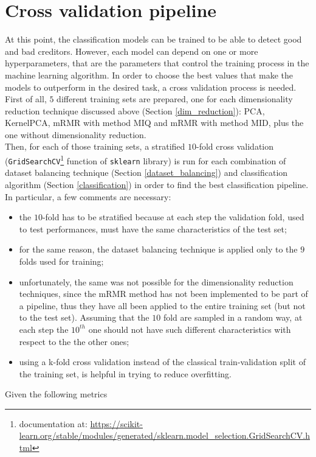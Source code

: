 \documentclass[letterpaper]{article}
\begin{document}
	\section{Cross validation pipeline} \label{cv}
	At this point, the classification models can be trained to be able to detect good and bad creditors. However, each model can depend on one or more hyperparameters, that are the parameters that control the training process in the machine learning algorithm. In order to choose the best values that make the models to outperform in the desired task, a cross validation process is needed. \\
	First of all, $5$ different training sets are prepared, one for each dimensionality reduction technique discussed above (Section \ref{dim_reduction}): PCA, KernelPCA, mRMR with method MIQ and mRMR with method MID, plus the one without dimensionality reduction.\\
	Then, for each of those training sets, a stratified $10$-fold cross validation (\texttt{GridSearchCV}\footnote{documentation at: \url{https://scikit-learn.org/stable/modules/generated/sklearn.model_selection.GridSearchCV.html}} function of \texttt{sklearn} library) is run for each combination of dataset balancing technique (Section \ref{dataset_balancing}) and classification algorithm (Section \ref{classification}) in order to find the best classification pipeline. 
	In particular, a few comments are necessary:
	\begin{itemize}
		\item the $10$-fold has to be stratified because at each step the validation fold, used to test performances, must have the same characteristics of the test set;
		\item for the same reason, the dataset balancing technique is applied only to the $9$ folds used for training;
		\item unfortunately, the same was not possible for the dimensionality reduction techniques, since the mRMR method has not been implemented to be part of a pipeline, thus they have all been applied to the entire training set (but not to the test set). Assuming that the $10$ fold are sampled in a random way, at each step the $10^{th}$ one should not have such different characteristics with respect to the the other ones;
		\item using a k-fold cross validation instead of the classical train-validation split of the training set, is helpful in trying to reduce overfitting.
	\end{itemize}
	Given the following metrics
\end{document}
